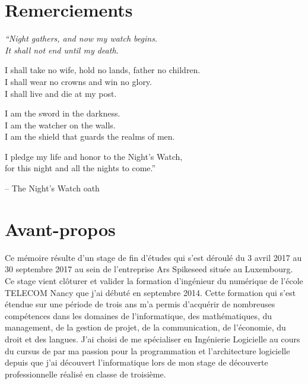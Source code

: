\documentclass{tnreport}
\begin{document}
  
\maketitle
{}


\cleardoublepage

\makesecondtitle

\section*{Remerciements}

{\em
``Night gathers, and now my watch begins. \\
It shall not end until my death.

I shall take no wife, hold no lands, father no children. \\
I shall wear no crowns and win no glory. \\
I shall live and die at my post.

I am the sword in the darkness. \\
I am the watcher on the walls. \\
I am the shield that guards the realms of men.

I pledge my life and honor to the Night's Watch, \\
for this night and all the nights to come.''
}

\hspace{4cm} -- The Night's Watch oath


\cleardoublepage

\section*{Avant-propos}

Ce mémoire résulte d'un stage de fin d'études qui s'est déroulé du 3 avril 2017 au 30 septembre 2017 au sein de l'entreprise Ar{\texteta}s Spikeseed située au Luxembourg. Ce stage vient clôturer et valider la formation d'ingénieur du numérique de l'école TELECOM Nancy que j'ai débuté en septembre 2014. Cette formation qui s'est étendue sur une période de trois ans m'a permis d'acquérir de nombreuses compétences dans les domaines de l'informatique, des mathématiques, du management, de la gestion de projet, de la communication, de l'économie, du droit et des langues. J'ai choisi de me spécialiser en Ingénierie Logicielle au cours du cursus de par ma passion pour la programmation et l'architecture logicielle depuis que j'ai découvert l'informatique lors de mon stage de découverte professionnelle réalisé en classe de troisième.
\end{document}
